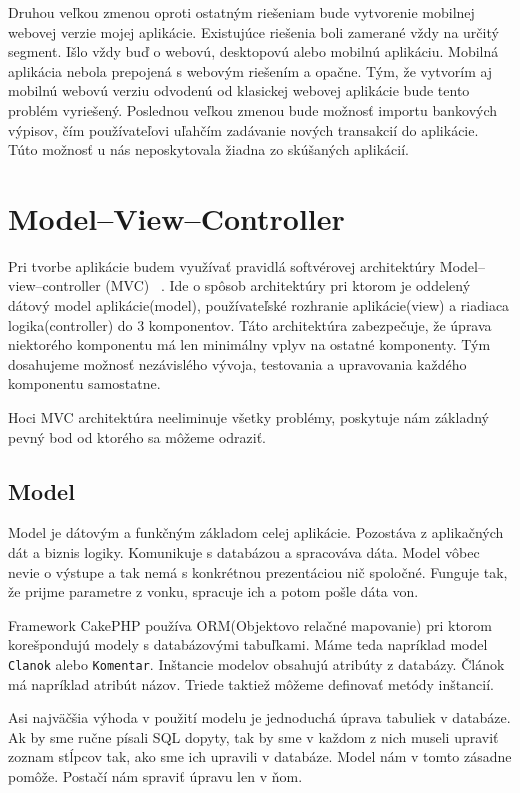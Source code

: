 \documentclass[12pt,onesided]{book}
\begin{document}
Druhou veľkou zmenou oproti ostatným riešeniam bude vytvorenie mobilnej webovej verzie mojej aplikácie. Existujúce riešenia boli zamerané vždy na určitý segment. Išlo vždy buď o webovú, desktopovú alebo mobilnú aplikáciu. Mobilná aplikácia nebola prepojená s webovým riešením a opačne. Tým, že vytvorím aj mobilnú webovú verziu odvodenú od klasickej webovej aplikácie bude tento problém vyriešený. Poslednou veľkou zmenou bude možnosť importu bankových výpisov, čím používateľovi uľahčím zadávanie nových transakcií do aplikácie. Túto možnosť u nás neposkytovala žiadna zo skúšaných aplikácií.

\section{Model–View–Controller}
Pri tvorbe aplikácie budem využívať pravidlá softvérovej architektúry Model–view–controller (MVC) \cite{MVCdevbook}\ . Ide o spôsob architektúry pri ktorom je oddelený dátový model aplikácie(model), používateľské rozhranie aplikácie(view) a riadiaca logika(controller) do 3 komponentov. Táto architektúra zabezpečuje, že úprava niektorého komponentu má len minimálny vplyv na ostatné komponenty. Tým dosahujeme možnosť nezávislého vývoja, testovania a upravovania každého komponentu samostatne.

Hoci MVC architektúra neeliminuje všetky problémy, poskytuje nám základný pevný bod od ktorého sa môžeme odraziť.

\subsection{Model}
Model je dátovým a funkčným základom celej aplikácie. Pozostáva z aplikačných dát a biznis logiky. Komunikuje s databázou a spracováva dáta. Model vôbec nevie o výstupe a tak nemá s konkrétnou prezentáciou nič spoločné. Funguje tak, že prijme parametre z vonku, spracuje ich a potom pošle dáta von. 

Framework CakePHP používa ORM(Objektovo relačné mapovanie) pri ktorom korešpondujú modely s databázovými tabuľkami. Máme teda napríklad model \texttt{Clanok} alebo \texttt{Komentar}. Inštancie modelov obsahujú atribúty z databázy. Článok má napríklad atribút názov. Triede taktiež môžeme definovať metódy inštancií.

Asi najväčšia výhoda v použití modelu je jednoduchá úprava tabuliek v databáze.  Ak by sme ručne písali SQL dopyty, tak by sme v každom z nich museli upraviť zoznam stĺpcov tak, ako sme ich upravili v databáze. Model nám v tomto zásadne pomôže. Postačí nám spraviť úpravu len v ňom.
\end{document}
